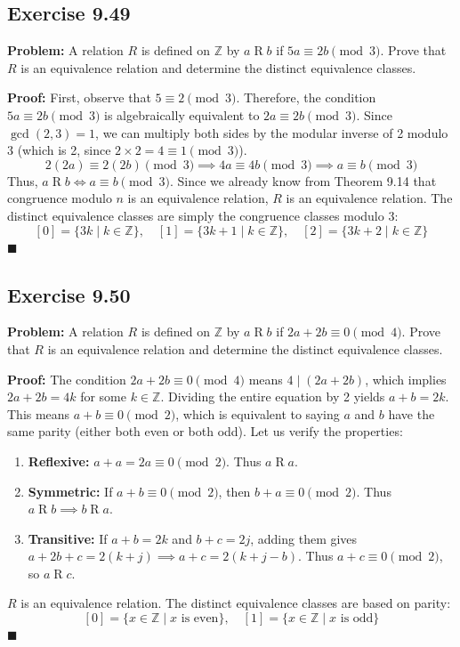 \documentclass[11pt, a4paper]{article}
\theoremstyle{definition}
\theoremstyle{remark}
\begin{document}
\subsection*{Exercise 9.49}
\textbf{Problem:} A relation $R$ is defined on $\mathbb{Z}$ by $a \mathrel{R} b$ if $5a \equiv 2b \pmod{3}$. Prove that $R$ is an equivalence relation and determine the distinct equivalence classes.

\textbf{Proof:}
First, observe that $5 \equiv 2 \pmod{3}$. Therefore, the condition $5a \equiv 2b \pmod{3}$ is algebraically equivalent to $2a \equiv 2b \pmod{3}$. Since $\gcd(2, 3) = 1$, we can multiply both sides by the modular inverse of 2 modulo 3 (which is 2, since $2 \times 2 = 4 \equiv 1 \pmod{3}$). 
\[ \displaystyle 2(2a) \equiv 2(2b) \pmod{3} \implies 4a \equiv 4b \pmod{3} \implies a \equiv b \pmod{3} \]
Thus, $a \mathrel{R} b \iff a \equiv b \pmod{3}$. 
Since we already know from Theorem 9.14 that congruence modulo $n$ is an equivalence relation, $R$ is an equivalence relation. 
The distinct equivalence classes are simply the congruence classes modulo 3:
\[ \displaystyle [0] = \{ 3k \mid k \in \mathbb{Z} \}, \quad [1] = \{ 3k + 1 \mid k \in \mathbb{Z} \}, \quad [2] = \{ 3k + 2 \mid k \in \mathbb{Z} \} \]
$\blacksquare$

\subsection*{Exercise 9.50}
\textbf{Problem:} A relation $R$ is defined on $\mathbb{Z}$ by $a \mathrel{R} b$ if $2a + 2b \equiv 0 \pmod{4}$. Prove that $R$ is an equivalence relation and determine the distinct equivalence classes.

\textbf{Proof:}
The condition $2a + 2b \equiv 0 \pmod{4}$ means $4 \mid (2a + 2b)$, which implies $2a + 2b = 4k$ for some $k \in \mathbb{Z}$. Dividing the entire equation by 2 yields $a + b = 2k$. This means $a + b \equiv 0 \pmod{2}$, which is equivalent to saying $a$ and $b$ have the same parity (either both even or both odd). 
Let us verify the properties:
\begin{enumerate}
    \item \textbf{Reflexive:} $a + a = 2a \equiv 0 \pmod{2}$. Thus $a \mathrel{R} a$.
    \item \textbf{Symmetric:} If $a + b \equiv 0 \pmod{2}$, then $b + a \equiv 0 \pmod{2}$. Thus $a \mathrel{R} b \implies b \mathrel{R} a$.
    \item \textbf{Transitive:} If $a + b = 2k$ and $b + c = 2j$, adding them gives $a + 2b + c = 2(k + j) \implies a + c = 2(k + j - b)$. Thus $a + c \equiv 0 \pmod{2}$, so $a \mathrel{R} c$.
\end{enumerate}
$R$ is an equivalence relation. The distinct equivalence classes are based on parity:
\[ \displaystyle [0] = \{ x \in \mathbb{Z} \mid x \text{ is even} \}, \quad [1] = \{ x \in \mathbb{Z} \mid x \text{ is odd} \} \]
$\blacksquare$
\end{document}
